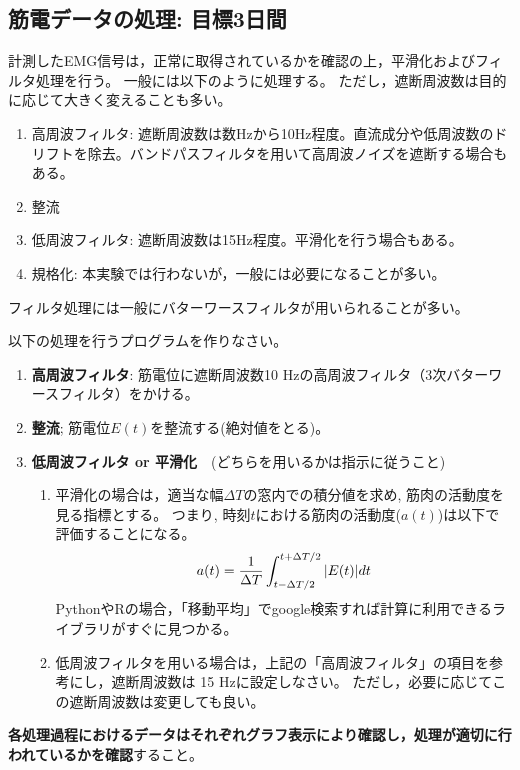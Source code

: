 \documentclass{jsarticle}
\begin{document}
\subsection{筋電データの処理: 目標3日間}

計測したEMG信号は，正常に取得されているかを確認の上，平滑化およびフィルタ処理を行う。
一般には以下のように処理する。
ただし，遮断周波数は目的に応じて大きく変えることも多い。
\begin{enumerate}
  \item 高周波フィルタ: 遮断周波数は数Hzから10Hz程度。直流成分や低周波数のドリフトを除去。バンドパスフィルタを用いて高周波ノイズを遮断する場合もある。
  \item 整流
  \item 低周波フィルタ: 遮断周波数は15Hz程度。平滑化を行う場合もある。
  \item 規格化: 本実験では行わないが，一般には必要になることが多い。
\end{enumerate}
フィルタ処理には一般にバターワースフィルタが用いられることが多い。

以下の処理を行うプログラムを作りなさい。
\begin{enumerate}
\item \textbf{高周波フィルタ}: 筋電位に遮断周波数10 Hzの高周波フィルタ（3次バターワースフィルタ）をかける。
\item \textbf{整流}; 筋電位$E(t)$を整流する(絶対値をとる)。
\item \textbf{低周波フィルタ or 平滑化}　(どちらを用いるかは指示に従うこと)
  \begin{enumerate}
    \item 平滑化の場合は，適当な幅$\Delta T$の窓内での積分値を求め, 筋肉の活動度を見る指標とする。
    つまり, 時刻$t$における筋肉の活動度($a(t)$)は以下で評価することになる。
    \begin{align}
      a(t)=\frac{1}{\Delta T}\int_{t-\Delta T/2}^{t+\Delta T/2}|E(t)|dt\notag
    \end{align}
    PythonやRの場合，「移動平均」でgoogle検索すれば計算に利用できるライブラリがすぐに見つかる。
    \item 低周波フィルタを用いる場合は，上記の「高周波フィルタ」の項目を参考にし，遮断周波数は 15 Hzに設定しなさい。 
    ただし，必要に応じてこの遮断周波数は変更しても良い。
  \end{enumerate}
\end{enumerate}

\textbf{各処理過程におけるデータはそれぞれグラフ表示により確認し，処理が適切に行われているかを確認}すること。
\end{document}
